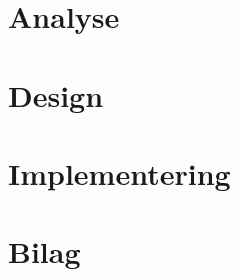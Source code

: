 \documentclass[10pt,a4paper]{article}
\begin{document}
    \thispagestyle{plain}
    
    
    
    
    \newpage
    \tableofcontents
    \cleardoublepage
    
    \setcounter{page}{1}
    \def\emptyline{\vspace{12pt}}
    
    \section{Analyse}
    
    \section{Design}
    
    \section{Implementering}
    
    \section{Bilag}
    
    
    
\end{document}
